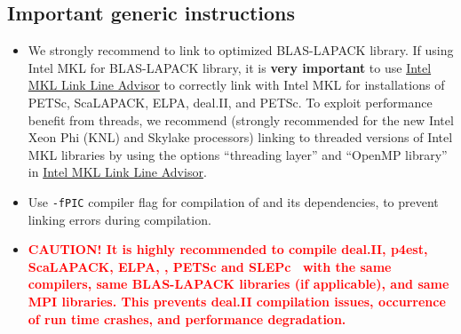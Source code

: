 \subsection{Important generic instructions}
\begin{itemize}
\item We strongly recommend to link to optimized BLAS-LAPACK library. If using Intel MKL for BLAS-LAPACK library, it is {\bf very important} to use \href{https://software.intel.com/en-us/articles/intel-mkl-link-line-advisor}{Intel MKL Link Line Advisor} to correctly link with Intel MKL for installations of PETSc, ScaLAPACK, ELPA, deal.II, and PETSc. To exploit performance benefit from threads, we recommend (strongly recommended for the new Intel Xeon Phi (KNL) and Skylake processors) linking to threaded versions of Intel MKL libraries by using the options ``threading layer'' and  ``OpenMP library'' in \href{https://software.intel.com/en-us/articles/intel-mkl-link-line-advisor}{Intel MKL Link Line Advisor}.

\item Use \verb|-fPIC| compiler flag for compilation of \dftfe{} and its dependencies, to prevent linking errors during \dftfe{} compilation.	

\item \textcolor{red}{\bf CAUTION! It is  highly recommended to compile deal.II, p4est, ScaLAPACK, ELPA, \dftfe, PETSc and SLEPc~ with the same compilers, same BLAS-LAPACK libraries (if applicable), and same MPI libraries. This prevents deal.II compilation issues, occurrence of run time crashes, and \dftfe{} performance degradation.}  
\end{itemize}
